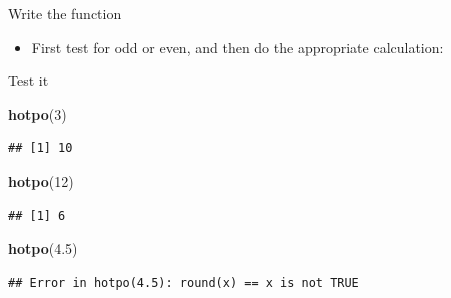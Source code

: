\documentclass[
  ignorenonframetext,
]{beamer}
\newenvironment{Shaded}{\begin{snugshade}}{\end{snugshade}}
\newcommand{\ControlFlowTok}[1]{\textcolor[rgb]{0.13,0.29,0.53}{\textbf{#1}}}
\newcommand{\DecValTok}[1]{\textcolor[rgb]{0.00,0.00,0.81}{#1}}
\newcommand{\FloatTok}[1]{\textcolor[rgb]{0.00,0.00,0.81}{#1}}
\newcommand{\KeywordTok}[1]{\textcolor[rgb]{0.13,0.29,0.53}{\textbf{#1}}}
\newcommand{\NormalTok}[1]{#1}
\newcommand{\OperatorTok}[1]{\textcolor[rgb]{0.81,0.36,0.00}{\textbf{#1}}}
\newcommand{\StringTok}[1]{\textcolor[rgb]{0.31,0.60,0.02}{#1}}
\providecommand{\tightlist}{%
  \setlength{\itemsep}{0pt}\setlength{\parskip}{0pt}}
\begin{document}
\begin{frame}[fragile]{Write the function}
\protect\hypertarget{write-the-function}{}

\begin{itemize}
\tightlist
\item
  First test for odd or even, and then do the appropriate calculation:
\end{itemize}

\begin{Shaded}
\end{Shaded}

\end{frame}

\begin{frame}[fragile]{Test it}
\protect\hypertarget{test-it}{}

\begin{Shaded}
\begin{Highlighting}[]
\KeywordTok{hotpo}\NormalTok{(}\DecValTok{3}\NormalTok{)}
\end{Highlighting}
\end{Shaded}

\begin{verbatim}
## [1] 10
\end{verbatim}

\begin{Shaded}
\begin{Highlighting}[]
\KeywordTok{hotpo}\NormalTok{(}\DecValTok{12}\NormalTok{)}
\end{Highlighting}
\end{Shaded}

\begin{verbatim}
## [1] 6
\end{verbatim}

\begin{Shaded}
\begin{Highlighting}[]
\KeywordTok{hotpo}\NormalTok{(}\FloatTok{4.5}\NormalTok{)}
\end{Highlighting}
\end{Shaded}

\begin{verbatim}
## Error in hotpo(4.5): round(x) == x is not TRUE
\end{verbatim}

\end{frame}
\end{document}
